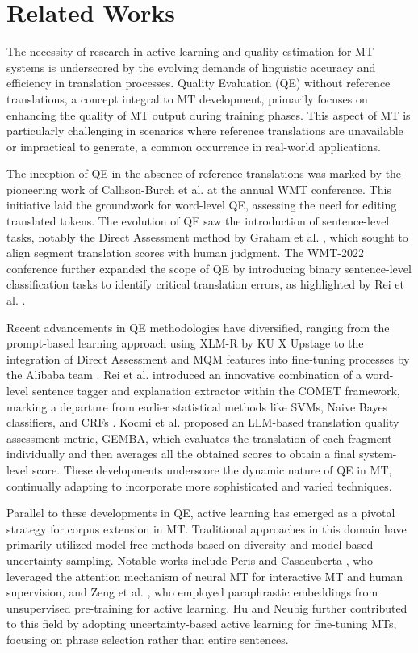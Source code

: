\section{Related Works}
The necessity of research in active learning and quality estimation for MT systems is underscored by the evolving demands of linguistic accuracy and efficiency in translation processes. Quality Evaluation (QE) without reference translations, a concept integral to MT development, primarily focuses on enhancing the quality of MT output during training phases. This aspect of MT is particularly challenging in scenarios where reference translations are unavailable or impractical to generate, a common occurrence in real-world applications.

The inception of QE in the absence of reference translations was marked by the pioneering work of Callison-Burch et al. \cite{callison2012proceedings} at the annual WMT conference. This initiative laid the groundwork for word-level QE, assessing the need for editing translated tokens. The evolution of QE saw the introduction of sentence-level tasks, notably the Direct Assessment method by Graham et al. \cite{graham2015accurate}, which sought to align segment translation scores with human judgment. The WMT-2022 conference further expanded the scope of QE by introducing binary sentence-level classification tasks to identify critical translation errors, as highlighted by Rei et al. \cite{rei2022cometkiwi}.

Recent advancements in QE methodologies have diversified, ranging from the prompt-based learning approach using XLM-R by KU X Upstage \cite{eo2022ku} to the integration of Direct Assessment and MQM features into fine-tuning processes by the Alibaba team \cite{chi2021infoxlm,bao2022alibaba}. Rei et al. \cite{rei2022cometkiwi} introduced an innovative combination of a word-level sentence tagger and explanation extractor within the COMET framework, marking a departure from earlier statistical methods like SVMs, Naive Bayes classifiers, and CRFs \cite{han2013quality}. Kocmi et al. \cite{kocmi-federmann-2023-gemba-mqm,kocmi-federmann-2023-large} proposed an LLM-based translation quality assessment metric, GEMBA, which evaluates the translation of each fragment individually and then averages all the obtained scores to obtain a final system-level score. These developments underscore the dynamic nature of QE in MT, continually adapting to incorporate more sophisticated and varied techniques. 

Parallel to these developments in QE, active learning has emerged as a pivotal strategy for corpus extension in MT. Traditional approaches in this domain have primarily utilized model-free methods based on diversity and model-based uncertainty sampling. Notable works include Peris and Casacuberta \cite{peris2018active}, who leveraged the attention mechanism of neural MT for interactive MT and human supervision, and Zeng et al. \cite{zeng2019empirical}, who employed paraphrastic embeddings from unsupervised pre-training for active learning. Hu and Neubig \cite{hu2021phrase} further contributed to this field by adopting uncertainty-based active learning for fine-tuning MTs, focusing on phrase selection rather than entire sentences.